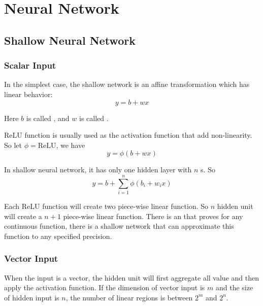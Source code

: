 \chapter{Neural Network}



\section{Shallow Neural Network}

\subsection{Scalar Input}

In the simplest case, the shallow network is an affine transformation which has linear behavior:
\begin{equation}
    y = b + wx
\end{equation}

Here $b$ is called , and $w$ is called .

ReLU function is usually used as the activation function that add non-linearity. So let $\phi = \text{ReLU}$, we have
\begin{equation}
    y = \phi (b + wx)
\end{equation}

In shallow neural network, it has only one hidden layer with $n$ s. So
\begin{equation}
    y = b + \sum_{i=1}^n \phi (b_i + w_i x)
\end{equation}

Each ReLU function will create two piece-wise linear function. So $n$ hidden unit will create a $n+1$ piece-wise linear function. There is an  that proves for any continuous function, there is a shallow network that can approximate this function to any specified precision.

\subsection{Vector Input}

When the input is a vector, the hidden unit will first aggregate all value and then apply the activation function. If the dimension of vector input is $m$ and the size of hidden input is $n$, the number of linear regions is between $2^m$ and $2^n$.





